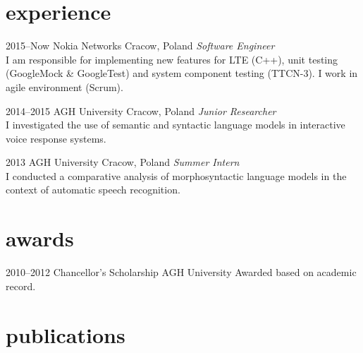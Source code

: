 \documentclass[]{friggeri-cv} %
\begin{document}

\section{experience}

\begin{entrylist}

\entry
{2015--Now}
{Nokia Networks}
{Cracow, Poland}
{\emph{Software Engineer} \\
  I am responsible for implementing new features for LTE (C++), unit testing (GoogleMock \& GoogleTest) and system component testing (TTCN-3). I work in agile environment (Scrum).
}

\entry
{2014--2015}
{AGH University}
{Cracow, Poland}
{\emph{Junior Researcher} \\
  I investigated the use of semantic and syntactic language models in interactive voice response systems.}

\entry
{2013}
{AGH University}
{Cracow, Poland}
{\emph{Summer Intern} \\
  I conducted a comparative analysis of morphosyntactic language models in the context of automatic speech recognition.}

\end{entrylist}


\section{awards}

\begin{entrylist}

\entry
{2010--2012}
{Chancellor's Scholarship}
{AGH University}
{Awarded based on academic record.}

\end{entrylist}


\section{publications}

\end{document}
